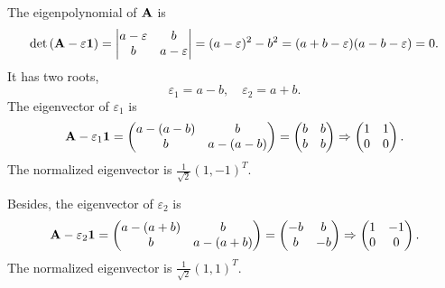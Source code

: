 \documentclass[a4paper]{book}
\newcounter{solution}[chapter]
\renewcommand\det[1]{\mathrm{det\left(#1\right)}}
\newcommand{\A}{{\bf A}}
\newcommand{\I}{{\bf 1}}
\begin{document}
	\begin{solution}
	
	The eigenpolynomial of $\A$ is
	\[
		\det{\A-\varepsilon\I} = \begin{vmatrix}
			a - \varepsilon & b \\ b & a - \varepsilon
		\end{vmatrix} = ( a - \varepsilon )^2 - b^2 = ( a + b - \varepsilon ) ( a - b - \varepsilon ) = 0.
	\]
	It has two roots,
	\[
		\varepsilon_1 = a - b , \quad \varepsilon_2 = a + b.
	\]
	The eigenvector of $\varepsilon_1$ is
	\[
		\A - \varepsilon_1 \I = \begin{pmatrix}
			a - ( a - b ) & b \\ b & a - ( a - b )
		\end{pmatrix} = \begin{pmatrix}
			b & b \\ b & b 
		\end{pmatrix} \Rightarrow \begin{pmatrix}
			1 & 1 \\ 0 & 0 
		\end{pmatrix}.
	\]
	The normalized eigenvector is $\frac{1}{ \sqrt{2} }(1,-1)^T$.
	
	Besides, the eigenvector of $\varepsilon_2$ is
	\[
		\A - \varepsilon_2 \I = \begin{pmatrix}
			a - ( a + b ) & b \\ b & a - ( a + b )
		\end{pmatrix} = \begin{pmatrix}
			-b & b \\ b & -b 
		\end{pmatrix} \Rightarrow \begin{pmatrix}
			1 & -1 \\ 0 & 0 
		\end{pmatrix}.
	\]
	The normalized eigenvector is $\frac{1}{ \sqrt{2} }(1,1)^T$.
	

\end{solution}
\end{document}
